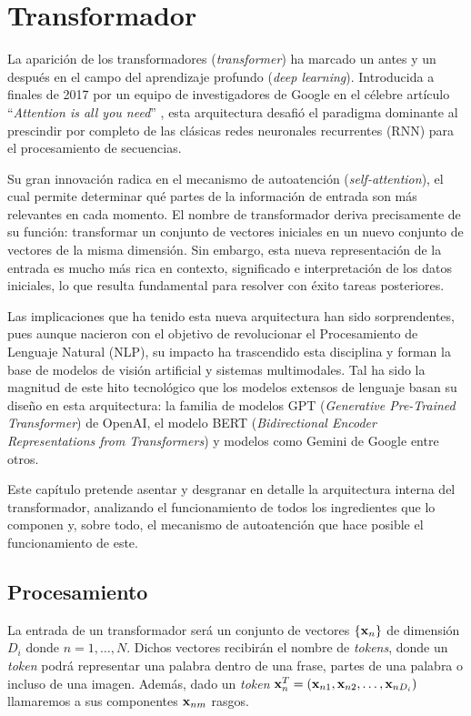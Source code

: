 \chapter{Transformador}
\label{cap:Transformers}
La aparición de los transformadores (\textit{transformer}) ha marcado un antes y un después en el campo del aprendizaje profundo (\textit{deep learning}). Introducida a finales de 2017 por un equipo de investigadores de Google  en el célebre artículo ``\textit{Attention is all you need}'' \cite{vaswani2017attention_arxiv}, esta arquitectura desafió el paradigma dominante al prescindir por completo de las clásicas redes neuronales recurrentes (RNN) para el procesamiento de secuencias.

Su gran innovación radica en el mecanismo de autoatención (\textit{self-attention}), el cual permite determinar qué partes de la información de entrada son más relevantes en cada momento. El nombre de transformador deriva precisamente de su función: transformar un conjunto de vectores iniciales en un nuevo conjunto de vectores de la misma dimensión. Sin embargo, esta nueva representación de la entrada es mucho más rica en contexto, significado e interpretación de los datos iniciales, lo que resulta fundamental para resolver con éxito tareas posteriores.

Las implicaciones que ha tenido esta nueva arquitectura han sido sorprendentes, pues aunque nacieron con el objetivo de revolucionar el Procesamiento de Lenguaje Natural (NLP), su impacto ha trascendido esta disciplina y  forman la base de modelos de visión artificial y sistemas multimodales. Tal ha sido la magnitud de este hito tecnológico que los  modelos extensos de lenguaje basan su diseño en esta arquitectura: la familia de modelos GPT (\textit{Generative Pre-Trained Transformer}) de OpenAI, el modelo BERT (\textit{Bidirectional Encoder Representations from Transformers}) y modelos como Gemini de Google entre otros.

Este capítulo pretende asentar y desgranar en detalle la arquitectura interna del transformador, analizando el funcionamiento de todos los ingredientes que lo componen y, sobre todo, el mecanismo de autoatención que hace posible el funcionamiento de este.

\section{Procesamiento}
\label{procesamiento}
La entrada de un transformador será un conjunto de vectores $\{\mathbf{x}_n\}$ de dimensión $D_i$ donde $n = 1, \dots,N$. Dichos vectores recibirán el nombre de \textit{tokens}, donde un \textit{token} podrá representar una palabra dentro de una frase, partes de una palabra o incluso de una imagen. Además, dado un \textit{token} $\mathbf{x}_n^T = ( \mathbf{x}_{n1}, \mathbf{x}_{n2}, \dots,\mathbf{x}_{nD_i})$ llamaremos a sus componentes $\mathbf{x}_{nm}$ rasgos.

